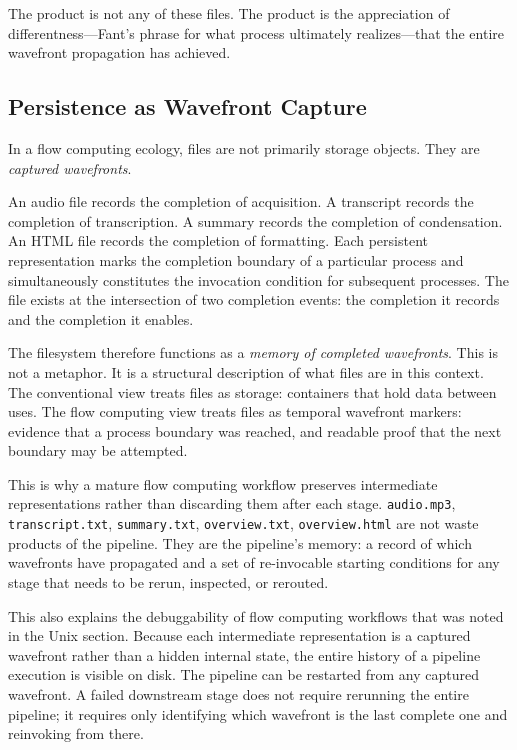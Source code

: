 \documentclass[12pt, a4paper]{article}
\begin{document}
The product is not any of these files. The product is the
appreciation of differentness---Fant's phrase for what process
ultimately realizes---that the entire wavefront propagation has
achieved.

\subsection{Persistence as Wavefront Capture}

In a flow computing ecology, files are not primarily storage objects.
They are \emph{captured wavefronts}.

An audio file records the completion of acquisition. A transcript
records the completion of transcription. A summary records the
completion of condensation. An HTML file records the completion of
formatting. Each persistent representation marks the completion
boundary of a particular process and simultaneously constitutes
the invocation condition for subsequent processes. The file exists
at the intersection of two completion events: the completion it
records and the completion it enables.

The filesystem therefore functions as a \emph{memory of completed
wavefronts}. This is not a metaphor. It is a structural description
of what files are in this context. The conventional view treats
files as storage: containers that hold data between uses. The flow
computing view treats files as temporal wavefront markers: evidence
that a process boundary was reached, and readable proof that the
next boundary may be attempted.

This is why a mature flow computing workflow preserves intermediate
representations rather than discarding them after each stage.
\texttt{audio.mp3}, \texttt{transcript.txt}, \texttt{summary.txt},
\texttt{overview.txt}, \texttt{overview.html} are not waste
products of the pipeline. They are the pipeline's memory: a
record of which wavefronts have propagated and a set of
re-invocable starting conditions for any stage that needs to be
rerun, inspected, or rerouted.

This also explains the debuggability of flow computing workflows
that was noted in the Unix section. Because each intermediate
representation is a captured wavefront rather than a hidden internal
state, the entire history of a pipeline execution is visible on
disk. The pipeline can be restarted from any captured wavefront.
A failed downstream stage does not require rerunning the entire
pipeline; it requires only identifying which wavefront is the last
complete one and reinvoking from there.
\end{document}
